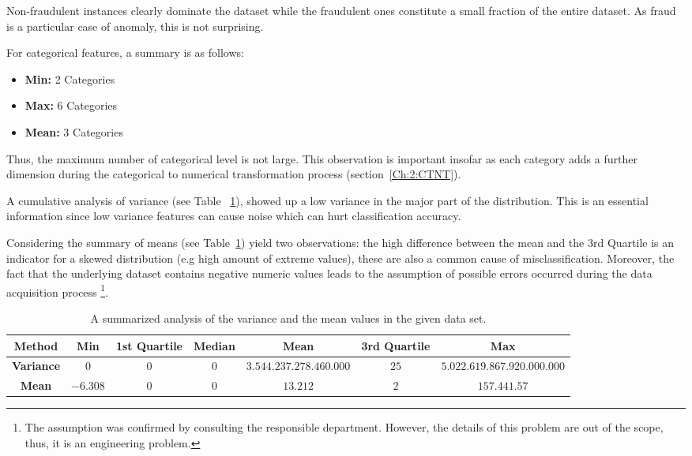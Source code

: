 Non-fraudulent instances clearly dominate the dataset while the fraudulent ones constitute a small fraction of the entire dataset. As fraud is a particular case of anomaly, this is not surprising.

For categorical features, a summary is as follows: 
\begin{itemize}
    \item \textbf{Min: } 2 Categories
    \item \textbf{Max: } 6 Categories
    \item \textbf{Mean:} 3 Categories
\end{itemize}

Thus, the maximum number of categorical level is not large.
This observation is important insofar as each category adds a further dimension during the categorical to numerical transformation process (section~\ref{Ch:2:CTNT}).

A cumulative analysis of variance (see Table~ \ref{tab:instance-summary}), showed up a low variance in the major part of the distribution. This is an essential information since low variance features can cause noise which can hurt classification accuracy. 

Considering the summary of means (see Table~\ref{tab:instance-summary}) yield two observations: the high difference between the mean and the 3rd Quartile is an indicator for a skewed distribution (e.g high amount of extreme values), these are also a common cause of  misclassification. Moreover, the fact that the underlying  dataset contains negative numeric values leads to the assumption of possible errors occurred during the data acquisition process \footnote{The assumption was confirmed by consulting the responsible department. However, the details of this problem are out of the scope, thus, it is an engineering problem.}.

\begin{table}[h!]
  \begin{center}
    \caption{A summarized analysis of the variance and the mean values in the given data set.}
    \label{tab:instance-summary}
    \begin{tabular}{c|c|c|c|c|c|c}
    Method & Min & 1st Quartile & Median & Mean & 3rd Quartile & Max  \\
      \hline
    \textbf{Variance} & \(0\) & \(0\) & \(0\) & \(3.544.237.278.460.000\) & \(25\) & \(5.022.619.867.920.000.000\) \\
     \hline
     \textbf{Mean} & \(-6.308\) & \(0\) & \(0\) & \(13.212\) & \(2\) & \(157.441.57\) \\
    \hline 
    \end{tabular}
  \end{center}
\end{table}



